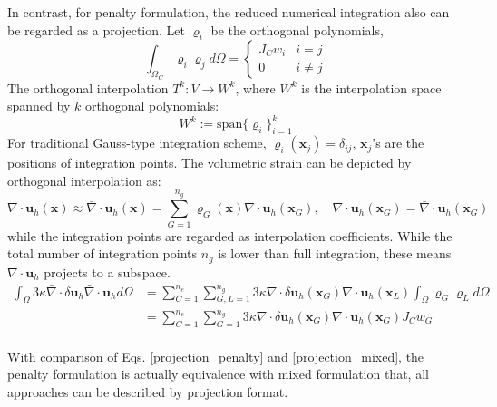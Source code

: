 In contrast, for penalty formulation, the reduced numerical integration also can be regarded as a projection. Let $\varrho_i$ be the orthogonal polynomials, 
\begin{equation}
\int_{\Omega_C} \varrho_i \varrho_j d\Omega = \begin{cases}
    J_C w_i  & i = j \\
    0 & i \ne j
\end{cases}
\end{equation}
The orthogonal interpolation $T^{k}: V \rightarrow W^{k}$, where $W^{k}$ is the interpolation space spanned by $k$ orthogonal polynomials:
\begin{equation}
    W^{k}:= \mathrm{span}\{\varrho_i \}_{i=1}^{k}
\end{equation}
For traditional Gauss-type integration scheme, $\varrho_i(\boldsymbol x_j) = \delta_{ij}$, $\boldsymbol x_j$'s are the positions of integration points. The volumetric strain can be depicted by orthogonal interpolation as:
\begin{equation}
    \nabla \cdot \boldsymbol u_h(\boldsymbol x) \approx \bar \nabla \cdot \boldsymbol u_h(\boldsymbol x) = \sum_{G=1}^{n_g} \varrho_G(\boldsymbol x) \nabla \cdot \boldsymbol u_h(\boldsymbol x_G), \quad \nabla \cdot \boldsymbol u_h(\boldsymbol x_G) = \bar \nabla \cdot \boldsymbol u_h(\boldsymbol x_G)
\end{equation}
while the integration points are regarded as interpolation coefficients. While the total number of integration points $n_g$ is lower than full integration, these means $\nabla \cdot \boldsymbol u_h$ projects to a subspace.
\begin{equation}\label{projection_penalty}
\begin{split}
\int_\Omega 3\kappa \bar \nabla \cdot \delta \boldsymbol u_h \bar \nabla \cdot \boldsymbol u_h d\Omega
    &= \sum_{C=1}^{n_e} \sum_{G,L=1}^{n_g} 3\kappa \nabla \cdot \delta \boldsymbol u_h(\boldsymbol x_G) \nabla \cdot \boldsymbol u_h(\boldsymbol x_L) \int_\Omega \varrho_G \varrho_L d\Omega  \\
    &= \sum_{C=1}^{n_e} \sum_{G=1}^{n_g} 3\kappa \nabla \cdot \delta \boldsymbol u_h(\boldsymbol x_G) \nabla \cdot \boldsymbol u_h(\boldsymbol x_G) J_C w_G \\
\end{split}
\end{equation}

With comparison of Eqs. \eqref{projection_penalty} and \eqref{projection_mixed}, the penalty formulation is actually equivalence with mixed formulation that, all approaches can be described by projection format.
